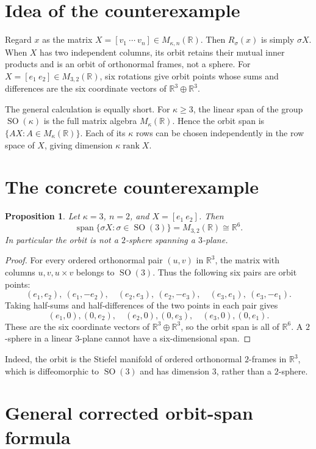\documentclass[11pt]{article}
\newtheorem{proposition}[theorem]{Proposition}
\newcommand{\R}{\mathbb R}
\newcommand{\SO}{\operatorname{SO}}
\newcommand{\Span}{\operatorname{span}}
\newcommand{\rank}{\operatorname{rank}}
\begin{document}
\section{Idea of the counterexample}

Regard $x$ as the matrix $X=[v_1\ \cdots\ v_n]\in M_{\kappa,n}(\R)$.
Then $R_\sigma(x)$ is simply $\sigma X$.  When $X$ has two independent
columns, its orbit retains their mutual inner products and is an orbit of
orthonormal frames, not a sphere.  For $X=[e_1\ e_2]\in M_{3,2}(\R)$,
six rotations give orbit points whose sums and differences are the six
coordinate vectors of $\R^3\oplus\R^3$.

The general calculation is equally short.  For $\kappa\geq3$, the linear
span of the group $\SO(\kappa)$ is the full matrix algebra
$M_\kappa(\R)$.  Hence the orbit span is $\{AX:A\in M_\kappa(\R)\}$.
Each of its $\kappa$ rows can be chosen independently in the row space of
$X$, giving dimension $\kappa\rank X$.

\section{The concrete counterexample}

\begin{proposition}\label{prop:counterexample}
Let $\kappa=3$, $n=2$, and $X=[e_1\ e_2]$.  Then
\[
 \Span\{\sigma X:\sigma\in\SO(3)\}=M_{3,2}(\R)\cong\R^6.
\]
In particular the orbit is not a $2$-sphere spanning a $3$-plane.
\end{proposition}

\begin{proof}
For every ordered orthonormal pair $(u,v)$ in $\R^3$, the matrix with
columns $u,v,u\times v$ belongs to $\SO(3)$.  Thus the following six pairs
are orbit points:
\[
 (e_1,e_2),\ (e_1,-e_2),\quad
 (e_2,e_3),\ (e_2,-e_3),\quad
 (e_3,e_1),\ (e_3,-e_1).
\]
Taking half-sums and half-differences of the two points in each pair gives
\[
 (e_1,0),(0,e_2),\quad
 (e_2,0),(0,e_3),\quad
 (e_3,0),(0,e_1).
\]
These are the six coordinate vectors of $\R^3\oplus\R^3$, so the orbit
span is all of $\R^6$.  A $2$-sphere in a linear $3$-plane cannot have a
six-dimensional span.
\end{proof}

Indeed, the orbit is the Stiefel manifold of ordered orthonormal $2$-frames
in $\R^3$, which is diffeomorphic to $\SO(3)$ and has dimension $3$, rather
than a $2$-sphere.

\section{General corrected orbit-span formula}
\end{document}
